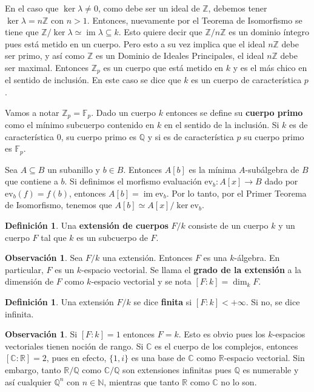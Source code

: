 \documentclass[12pt]{book}
\theoremstyle{definition}
\newtheorem{obs}[teo]{Observación}
\newtheorem{defn}[teo]{Definición}
\newcommand{\CC}{\mathbb{C}}
\newcommand{\RR}{\mathbb{R}}      %
\newcommand{\ZZ}{\mathbb{Z}}      %
\newcommand{\QQ}{\mathbb{Q}}
\newcommand{\FF}{\mathbb{F}}
\DeclareMathOperator{\im}{im}
\begin{document}
En el caso que $\ker\lambda \neq 0$, como debe ser un ideal de $\ZZ$, debemos tener $\ker \lambda = n\ZZ$ con $n>1$. Entonces, nuevamente por el Teorema de Isomorfismo se tiene que $\ZZ/\ker\lambda \simeq \im\lambda\subseteq k$. Esto quiere decir que $\ZZ/n\ZZ$ es un dominio íntegro pues está metido en un cuerpo. Pero esto a su vez implica que el ideal $n\ZZ$ debe ser primo, y así como $\ZZ$ es un Dominio de Ideales Principales, el ideal $n\ZZ$ debe ser maximal. Entonces $\ZZ_p$ es un cuerpo que está metido en $k$ y es el más chico en el sentido de inclusión. En este caso se dice que $k$ es un cuerpo de característica $p$.

Vamos a notar $\ZZ_p = \FF_p$. Dado un cuerpo $k$ entonces se define su \textbf{cuerpo primo} como el mínimo subcuerpo contenido en $k$ en el sentido de la inclusión. Si $k$ es de característica $0$, su cuerpo primo es $\QQ$ y si es de característica $p$ su cuerpo primo es $\FF_p$.

Sea $A\subseteq B$ un subanillo y $b\in B$. Entonces $A[b]$ es la mínima $A$-subálgebra de $B$ que contiene a $b$. Si definimos el morfismo evaluación $\mathrm{ev}_b:A[x]\to B$ dado por $\mathrm{ev}_b(f) = f(b)$, entonces $A[b] = \im \mathrm{ev}_b$. Por lo tanto, por el Primer Teorema de Isomorfismo, tenemos que $A[b]\simeq A[x]/\ker \mathrm{ev}_b$.

\begin{defn}
Una \textbf{extensión de cuerpos} $F/k$ consiste de un cuerpo $k$ y un cuerpo $F$ tal que $k$ es un subcuerpo de $F$.
\end{defn}

\begin{obs}
Sea $F/k$ una extensión. Entonces $F$ es una $k$-álgebra. En particular, $F$ es un $k$-espacio vectorial. Se llama el \textbf{grado de la extensión} a la dimensión de $F$ como $k$-espacio vectorial y se nota $[F:k] = \dim_k F$.
\end{obs}

\begin{defn}
Una extensión $F/k$ se dice \textbf{finita} si $[F:k]<+\infty$. Si no, se dice infinita.
\end{defn}

\begin{obs}
Si $[F:k]=1$ entonces $F=k$. Esto es obvio pues los $k$-espacios vectoriales tienen noción de rango. Si $\CC$ es el cuerpo de los complejos, entonces $[\CC:\RR]=2$, pues en efecto, $\{1,i\}$ es una base de $\CC$ como $\RR$-espacio vectorial. Sin embargo, tanto $\RR/\QQ$ como $\CC/\QQ$ son extensiones infinitas pues $\QQ$ es numerable y así cualquier $\QQ^n$ con $n\in\mathbb{N}$, mientras que tanto $\RR$ como $\CC$ no lo son.
\end{obs}
\end{document}

